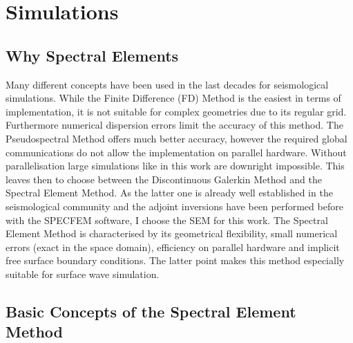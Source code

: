
\chapter{Simulations}


\section{Why Spectral Elements}

Many different concepts have been used in the last decades for seismological simulations. 
While the Finite Difference (FD) Method is the easiest in terms of implementation, it is not suitable for 
complex geometries due to its regular grid. %
Furthermore numerical dispersion errors limit the accuracy of this method.
The Pseudospectral Method offers much better accuracy, however the required global communications do not allow the 
implementation on parallel hardware. Without parallelisation large simulations like in this work are downright impossible.
This leaves then to choose between the Discontinuous Galerkin Method and the Spectral Element Method. As the latter one 
is already well established in the seismological community and the adjoint inversions have been performed before with the
SPECFEM software, I choose the SEM for this work. 
The Spectral Element Method is characterised by its geometrical flexibility, small numerical errors (exact in the space domain), 
efficiency on parallel hardware and implicit free surface boundary conditions. 
The latter point makes this method especially suitable for surface wave simulation. %

\section{Basic Concepts of the Spectral Element Method}


